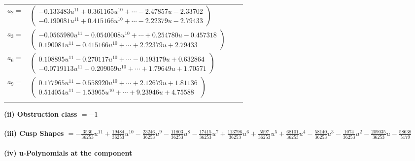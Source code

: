 \documentclass[1p]{elsarticle_modified}
\theoremstyle{definition}
\begin{document}
\begin{tabular}{m{7pt} m{180pt} m{7pt} m{180pt} }
\flushright $a_{2}=$&$\begin{pmatrix}-0.133483 u^{11}+0.361165 u^{10}+\cdots-2.47857 u-2.33702\\-0.190081 u^{11}+0.415166 u^{10}+\cdots-2.22379 u-2.79433\end{pmatrix}$ \\
\flushright $a_{3}=$&$\begin{pmatrix}-0.0565980 u^{11}+0.0540008 u^{10}+\cdots+0.254780 u-0.457318\\0.190081 u^{11}-0.415166 u^{10}+\cdots+2.22379 u+2.79433\end{pmatrix}$ \\
\flushright $a_{6}=$&$\begin{pmatrix}0.108895 u^{11}-0.270117 u^{10}+\cdots-0.193179 u+0.632864\\-0.0719113 u^{11}+0.209059 u^{10}+\cdots+1.79649 u+1.70571\end{pmatrix}$ \\
\flushright $a_{9}=$&$\begin{pmatrix}0.177965 u^{11}-0.558920 u^{10}+\cdots+2.12679 u+1.81136\\0.514054 u^{11}-1.53965 u^{10}+\cdots+9.23946 u+4.75588\end{pmatrix}$\\&\end{tabular}
\flushleft \textbf{(ii) Obstruction class $= -1$}\\~\\
\flushleft \textbf{(iii) Cusp Shapes $= -\frac{3530}{36253} u^{11}+\frac{19484}{36253} u^{10}-\frac{23246}{36253} u^9-\frac{11803}{36253} u^8-\frac{17415}{36253} u^7+\frac{113796}{36253} u^6+\frac{5597}{36253} u^5+\frac{68101}{36253} u^4-\frac{58140}{36253} u^3-\frac{1074}{36253} u^2-\frac{209035}{36253} u-\frac{58638}{5179}$}\\~\\
\newpage\renewcommand{\arraystretch}{1}
\flushleft \textbf{(iv) u-Polynomials at the component}\newline \\
\end{document}
